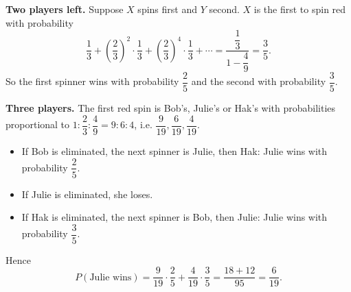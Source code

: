 \textbf{Two players left.} Suppose $X$ spins first and $Y$ second. $X$ is the first to spin red with probability
\[\dfrac13+\left(\dfrac23\right)^2\cdot\dfrac13+\left(\dfrac23\right)^4\cdot\dfrac13+\cdots=\dfrac{\dfrac13}{1-\dfrac49}=\dfrac35.\]
So the first spinner wins with probability $\dfrac25$ and the second with probability $\dfrac35$.

\textbf{Three players.} The first red spin is Bob's, Julie's or Hak's with probabilities proportional to $1:\dfrac23:\dfrac49=9:6:4$, i.e. $\dfrac9{19},\dfrac6{19},\dfrac4{19}$.
\begin{itemize}
\item If Bob is eliminated, the next spinner is Julie, then Hak: Julie wins with probability $\dfrac25$.
\item If Julie is eliminated, she loses.
\item If Hak is eliminated, the next spinner is Bob, then Julie: Julie wins with probability $\dfrac35$.
\end{itemize}
Hence
\[P(\text{Julie wins})=\dfrac9{19}\cdot\dfrac25+\dfrac4{19}\cdot\dfrac35=\dfrac{18+12}{95}=\boxed{\dfrac6{19}}.\]
